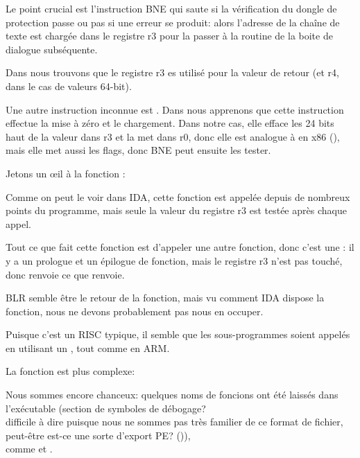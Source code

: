 Le point crucial est l'instruction \ac{BNE} qui saute si la vérification du dongle
de protection passe ou pas si une erreur se produit: alors l'adresse de la chaîne
de texte est chargée dans le registre r3 pour la passer à la routine de la boite de
dialogue subséquente.

Dans \PPCABI nous trouvons que le registre r3 es utilisé pour la valeur de retour
(et r4, dans le cas de valeurs 64-bit).

Une autre instruction inconnue est .
Dans \PPC nous apprenons que cette instruction effectue la mise à zéro et le chargement.
Dans notre cas, elle efface les 24 bits haut de la valeur dans r3 et la met dans
r0, donc elle est analogue à \MOVZX en x86 (), mais elle met aussi les
flags, donc \ac{BNE} peut ensuite les tester.

Jetons un \oe{}il à la fonction :



Comme on peut le voir dans \ac{IDA}, cette fonction est appelée depuis de nombreux
points du programme, mais seule la valeur du registre r3 est testée après chaque
appel.

Tout ce que fait cette fonction est d'appeler une autre fonction, donc c'est une
:
il y a un prologue et un épilogue de fonction, mais le registre r3 n'est pas touché,
donc  renvoie ce que  renvoie.

\ac{BLR} semble être le retour de la fonction, mais vu comment \ac{IDA} dispose la
fonction, nous ne devons probablement pas nous en occuper.

Puisque c'est un \ac{RISC} typique, il semble que les sous-programmes soient appelés
en utilisant un , tout comme en ARM.

La fonction  est plus complexe:




Nous sommes encore chanceux: quelques noms de foncions ont été laissés dans l'exécutable
(section de symboles de débogage?\\
difficile à dire puisque nous ne sommes pas très familier de ce format de fichier,
peut-être est-ce une sorte d'export PE? ()),\\
comme  et .

